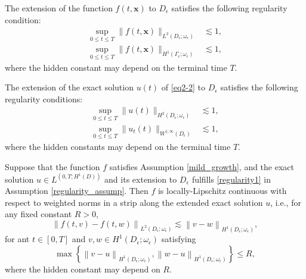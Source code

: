 \documentclass[10pt,a4paper]{amsart}
\begin{document}
\begin{assumption}
	\label{assumption1}
	The extension of the function $f(t,\bm x)$ to $D_{\epsilon}$ satisfies the following regularity condition:
	\begin{subequations}
		\begin{align}
			\label{smooth_cond1}
			\sup\limits_{0\leq t \leq T}\|f(t,\bm x)\|_{L^2(D_{\epsilon};\omega_{\epsilon})} &\lesssim 1,\\
			\label{smooth_cond2}
			\sup\limits_{0\leq t \leq T}\|f(t,\bm x)\|_{H^1(\Gamma_{\epsilon};\omega_{\epsilon})}&\lesssim 1,
		\end{align}
	\end{subequations}
	where the hidden constant may depend on the terminal time $T$.
\end{assumption}

\begin{assumption}
	\label{regularity_assump}
	The extension of the exact solution $u(t)$ of \eqref{eq2-2}   to $D_\epsilon$ satisfies the following regularity conditions:
	\begin{subequations}
		\begin{align}
			\label{regularity1}
			\sup\limits_{0\leq t \leq T}\|u(t)\|_{H^2(D_{\epsilon};\omega_{\epsilon})} &\lesssim 1,\\
			\label{regularity2}
			\sup\limits_{0\leq t \leq T}\|u_t(t)\|_{W^{1,\infty}(D_{\epsilon})}&\lesssim 1,
		\end{align}
	\end{subequations}
	where the hidden constants may depend on the terminal time  $T$.
\end{assumption}

\begin{lemma}
	\label{locally}
	Suppose that the function $f$ satisfies Assumption \ref{mild_growth}, and the exact solution $u\in L^(0,T;H^1(D))$ and its extension to $D_{\epsilon}$ fulfills \eqref{regularity1} in Assumption \ref{regularity_assump}. Then $f$ is locally-Lipschitz continuous with respect to weighted norms in a strip along the extended exact solution $u$, i.e., for any fixed constant $R>0$,
	\begin{equation}
		\label{locally_eq}
		\left\|f(t,v)-f(t,w)\right\|_{L^2(D_{\epsilon};\omega_{\epsilon})}\lesssim \left\|v-w\right\|_{H^1(D_{\epsilon};\omega_{\epsilon})},
	\end{equation}
	for ant $t \in [0,T]$ and $v,w\in H^1(D_{\epsilon};\omega_{\epsilon})$ satisfying
	\begin{equation}
		\label{locally_eq2}
		\max\left\{\left\|v-u\right\|_{H^1(D_{\epsilon};\omega_{\epsilon})},\left\|w-u\right\|_{H^1(D_{\epsilon};\omega_{\epsilon})} \right\}\leq R,
	\end{equation}
	where the hidden constant may depend on $R$.
	
\end{lemma}
\end{document}
